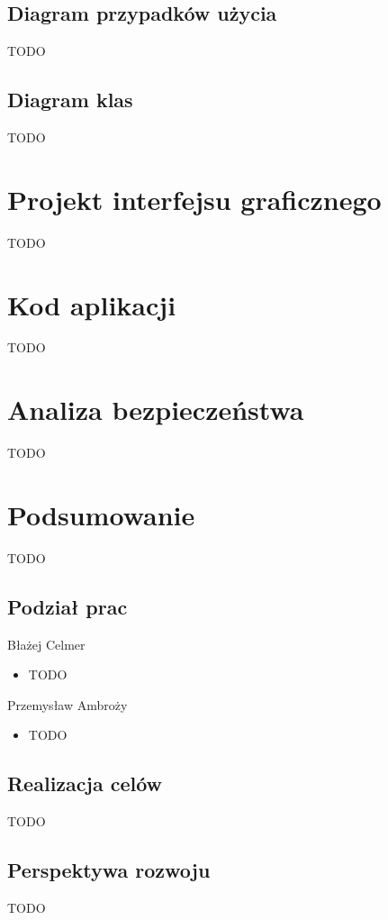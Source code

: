 \documentclass[polish,polish,a4paper]{article}
\begin{document}
\subsection{Diagram przypadków użycia}

TODO

\subsection{Diagram klas}

TODO

\section{Projekt interfejsu graficznego}

TODO

\section{Kod aplikacji}

TODO

\section{Analiza bezpieczeństwa}

TODO

\section{Podsumowanie}

TODO

\subsection*{Podział prac}

Błażej Celmer

\begin{itemize}
    \item TODO
\end{itemize}

Przemysław Ambroży

\begin{itemize}
    \item TODO
\end{itemize}

\subsection*{Realizacja celów}

TODO

\subsection*{Perspektywa rozwoju}

TODO
\end{document}

